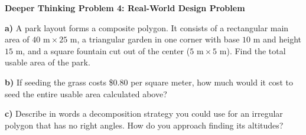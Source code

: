 \documentclass[12pt, letterpaper, fleqn]{article}
\begin{document}
\newpage

\begin{tcolorbox}[colback=white, colframe=black, boxrule=1pt, arc=4mm, left=6mm, right=6mm, top=5mm, bottom=5mm]
\textbf{Deeper Thinking Problem 4: Real-World Design Problem}

\medskip
\noindent
\textbf{a)} A park layout forms a composite polygon. It consists of a rectangular main area of $40\text{ m} \times 25\text{ m}$, a triangular garden in one corner with base $10\text{ m}$ and height $15\text{ m}$, and a square fountain cut out of the center ($5\text{ m} \times 5\text{ m}$). Find the total usable area of the park.
\vspace{5cm}

\noindent
\textbf{b)} If seeding the grass costs \$0.80 per square meter, how much would it cost to seed the entire usable area calculated above?
\vspace{5cm}

\noindent
\textbf{c)} Describe in words a decomposition strategy you could use for an irregular polygon that has no right angles. How do you approach finding its altitudes?
\vspace{5cm}
\end{tcolorbox}

\newpage
\end{document}
